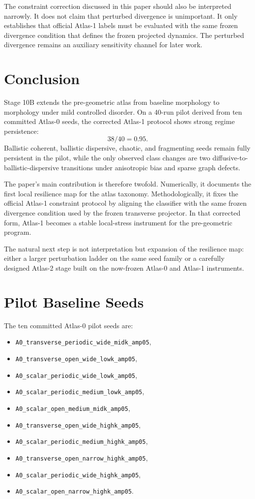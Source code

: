 \documentclass[11pt]{article}
\begin{document}
The constraint correction discussed in this paper should also be interpreted narrowly. It does not claim that perturbed divergence is unimportant. It only establishes that official Atlas-1 labels must be evaluated with the same frozen divergence condition that defines the frozen projected dynamics. The perturbed divergence remains an auxiliary sensitivity channel for later work.

\section{Conclusion}
Stage 10B extends the pre-geometric atlas from baseline morphology to morphology under mild controlled disorder. On a 40-run pilot derived from ten committed Atlas-0 seeds, the corrected Atlas-1 protocol shows strong regime persistence:
\begin{equation}
38/40 = 0.95.
\end{equation}
Ballistic coherent, ballistic dispersive, chaotic, and fragmenting seeds remain fully persistent in the pilot, while the only observed class changes are two diffusive-to-ballistic-dispersive transitions under anisotropic bias and sparse graph defects.

The paper's main contribution is therefore twofold. Numerically, it documents the first local resilience map for the atlas taxonomy. Methodologically, it fixes the official Atlas-1 constraint protocol by aligning the classifier with the same frozen divergence condition used by the frozen transverse projector. In that corrected form, Atlas-1 becomes a stable local-stress instrument for the pre-geometric program.

The natural next step is not interpretation but expansion of the resilience map: either a larger perturbation ladder on the same seed family or a carefully designed Atlas-2 stage built on the now-frozen Atlas-0 and Atlas-1 instruments.

\appendix
\section{Pilot Baseline Seeds}
The ten committed Atlas-0 pilot seeds are:
\begin{itemize}
\item \texttt{A0\_transverse\_periodic\_wide\_midk\_amp05},
\item \texttt{A0\_transverse\_open\_wide\_lowk\_amp05},
\item \texttt{A0\_scalar\_periodic\_wide\_lowk\_amp05},
\item \texttt{A0\_scalar\_periodic\_medium\_lowk\_amp05},
\item \texttt{A0\_scalar\_open\_medium\_midk\_amp05},
\item \texttt{A0\_transverse\_open\_wide\_highk\_amp05},
\item \texttt{A0\_scalar\_periodic\_medium\_highk\_amp05},
\item \texttt{A0\_transverse\_open\_narrow\_highk\_amp05},
\item \texttt{A0\_scalar\_periodic\_wide\_highk\_amp05},
\item \texttt{A0\_scalar\_open\_narrow\_highk\_amp05}.
\end{itemize}
\end{document}
